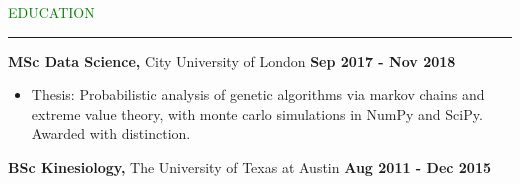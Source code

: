 \documentclass [
        11pt
] {article}
\begin{document}
\vspace*{10pt}


\noindent\textcolor{green}{EDUCATION \rule{16cm}{1pt}}

\vspace*{10pt}

\noindent \textbf {MSc Data Science,} City University of London
\hspace*{\fill} \textbf {Sep 2017 - Nov 2018}

\begin{itemize}[noitemsep,topsep=0pt]
\renewcommand{\labelitemi}{\scriptsize$\blacksquare$}
\item Thesis: Probabilistic analysis of genetic algorithms via markov chains
and extreme value theory, with monte carlo simulations in NumPy and SciPy.
Awarded with distinction.
\end{itemize}

\noindent \textbf {BSc Kinesiology,} The University of Texas at Austin
\hspace*{\fill} \textbf {Aug 2011 - Dec 2015}
\end{document}
